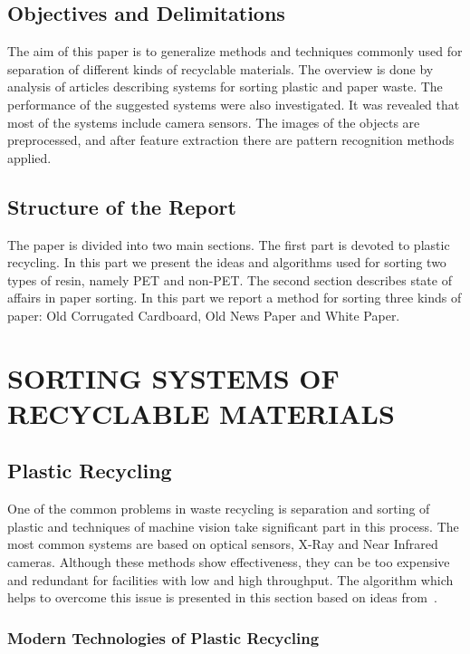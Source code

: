 \documentclass{lutmscthesis}[2010/09/22]
\begin{document}
\subsection{ Objectives and Delimitations }
The aim of this paper is to generalize methods and
techniques commonly used for separation of different
kinds of recyclable materials. The overview
is done by analysis of articles describing
systems for sorting plastic and paper waste. The
performance of the suggested systems were also
investigated. It was revealed that most of
the systems include camera sensors. The images
of the objects are preprocessed, and
after feature extraction there are pattern
recognition methods applied.

\subsection{ Structure of the Report }
The paper is divided into two main sections. The first part
is devoted to plastic recycling. In this part we present
the ideas and algorithms used for sorting two types of resin,
namely PET and non-PET. The second section describes
state of affairs in paper sorting. In this part
we report a method for sorting three kinds of paper:
Old Corrugated Cardboard, Old News Paper and White Paper.



\section{ SORTING SYSTEMS OF RECYCLABLE MATERIALS }
\subsection{ Plastic Recycling }

One of the common problems in waste recycling is
separation and sorting of plastic and techniques
of machine vision take significant part in this
process. The most common systems are based on optical
sensors, X-Ray and Near Infrared cameras. Although
these methods show effectiveness, they can be too
expensive and redundant for facilities with low and
high throughput. The algorithm which helps to overcome this issue
is presented in this section based on ideas from~\cite{Wahab:2006}.


\subsubsection*{ Modern Technologies of Plastic Recycling }
\end{document}
